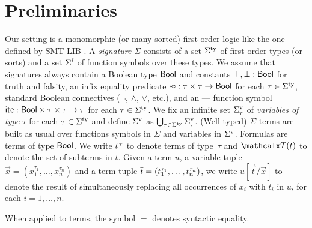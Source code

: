 
\section{Preliminaries}
\label{sec:prelim}

Our setting is a monomorphic (or many-sorted) first-order logic
like the one defined by SMT-LIB \cite{smtlib25}.
A \emph{signature} $\Sigma$ consists of
a set $\stypes{\Sigma}$ of %
first-order types
%
(or sorts) and a set $\sfuns{\Sigma}$ of function symbols over these types.
We assume that signatures always contain a Boolean type $\Bool$ and constants
$\ltrue, \lfalse : \Bool$ for truth and falsity,
an infix equality predicate ${\teq} : \tau \times \tau \to \Bool$
for each $\tau \in \stypes{\Sigma}$,
standard Boolean connectives ($\neg$, $\wedge$, $\vee$, etc.),
and an ---- function symbol
$\lite : \Bool \times \tau \times \tau \rightarrow \tau$
for each $\tau \in \stypes{\Sigma}$.
%
We fix an infinite set $\svars{\Sigma}_\tau$ of \emph{variables of type $\tau$}
for each $\tau \in \stypes{\Sigma}$ and
define $\svars{\Sigma}$ as $\bigcup_{\tau \in \stypes{\Sigma}} \svars{\Sigma}_\tau$.
(Well-typed) $\Sigma$-terms are built as usual over functions symbols in $\Sigma$ and variables in $\svars{\Sigma}$.
%
Formulas are terms of type $\Bool$.
We write $t\typ{\tau}$ to denote %
terms of type~$\tau$ and $\terms( t )$ to denote the set of subterms in $t$.
Given a term $u$, a variable tuple $\vec x = (x_1^{\tau_1},\dotsc,x_n^{\tau_n})$ and 
a term tuple $\vec t = (t_{\smash{1}\vphantom{n}}^{\tau_1},\dotsc,t_n^{\tau_n})$, 
we write $u[\vec t/\vec x]$ to denote the result of simultaneously replacing
all occurrences of $x_i$ with $t_i$ in $u$, for each $i=1,\dotsc,n$.
\begin{rep}When applied to terms, the symbol $=$ denotes syntactic equality.\end{rep}


